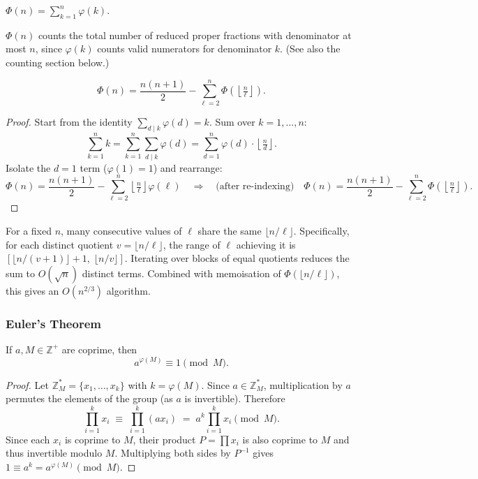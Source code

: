 \begin{definition}
$\displaystyle\Phi(n) = \sum_{k=1}^{n} \varphi(k)$.
\end{definition}

\begin{remark}
$\Phi(n)$ counts the total number of reduced proper fractions with denominator at most $n$, since $\varphi(k)$ counts valid numerators for denominator $k$. (See also the counting section below.)
\end{remark}

\begin{theorem}
\[
\Phi(n) = \frac{n(n+1)}{2} - \sum_{\ell=2}^{n} \Phi\!\left(\left\lfloor \tfrac{n}{\ell} \right\rfloor\right).
\]
\end{theorem}
\begin{proof}
Start from the identity $\sum_{d \mid k} \varphi(d) = k$. Sum over $k = 1, \ldots, n$:
\[
\sum_{k=1}^n k = \sum_{k=1}^n \sum_{d \mid k} \varphi(d) = \sum_{d=1}^n \varphi(d) \cdot \left\lfloor \tfrac{n}{d} \right\rfloor.
\]
Isolate the $d=1$ term ($\varphi(1)=1$) and rearrange:
\[
\Phi(n) = \frac{n(n+1)}{2} - \sum_{\ell=2}^{n} \left\lfloor \tfrac{n}{\ell} \right\rfloor \varphi(\ell) \quad \Longrightarrow \quad \text{(after re-indexing)} \quad \Phi(n) = \frac{n(n+1)}{2} - \sum_{\ell=2}^{n} \Phi\!\left(\left\lfloor \tfrac{n}{\ell} \right\rfloor\right).
\]
\end{proof}

\begin{remark}
For a fixed $n$, many consecutive values of $\ell$ share the same $\lfloor n/\ell \rfloor$. Specifically, for each distinct quotient $v = \lfloor n/\ell \rfloor$, the range of $\ell$ achieving it is $[\lfloor n/(v+1) \rfloor + 1,\; \lfloor n/v \rfloor]$. Iterating over blocks of equal quotients reduces the sum to $O(\sqrt{n})$ distinct terms. Combined with memoisation of $\Phi(\lfloor n/\ell \rfloor)$, this gives an $O(n^{2/3})$ algorithm.
\end{remark}

\subsubsection*{Euler's Theorem}

\begin{theorem}
If $a, M \in \mathbb{Z}^+$ are coprime, then
\[
a^{\varphi(M)} \equiv 1 \pmod{M}.
\]
\end{theorem}
\begin{proof}
Let $\mathbb{Z}_M^* = \{x_1, \ldots, x_k\}$ with $k = \varphi(M)$. Since $a \in \mathbb{Z}_M^*$, multiplication by $a$ permutes the elements of the group (as $a$ is invertible). Therefore
\[
\prod_{i=1}^k x_i \;\equiv\; \prod_{i=1}^k (ax_i) \;=\; a^k \prod_{i=1}^k x_i \pmod{M}.
\]
Since each $x_i$ is coprime to $M$, their product $P = \prod x_i$ is also coprime to $M$ and thus invertible modulo $M$. Multiplying both sides by $P^{-1}$ gives $1 \equiv a^k = a^{\varphi(M)} \pmod{M}$.
\end{proof}

